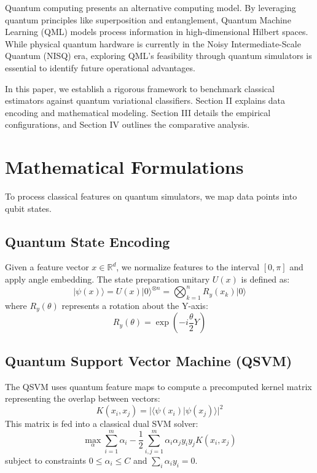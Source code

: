 \documentclass[journal]{IEEEtran}
\begin{document}
Quantum computing presents an alternative computing model. By leveraging quantum principles like superposition and entanglement, Quantum Machine Learning (QML) models process information in high-dimensional Hilbert spaces. While physical quantum hardware is currently in the Noisy Intermediate-Scale Quantum (NISQ) era, exploring QML's feasibility through quantum simulators is essential to identify future operational advantages.

In this paper, we establish a rigorous framework to benchmark classical estimators against quantum variational classifiers. Section II explains data encoding and mathematical modeling. Section III details the empirical configurations, and Section IV outlines the comparative analysis.

\section{Mathematical Formulations}
To process classical features on quantum simulators, we map data points into qubit states.

\subsection{Quantum State Encoding}
Given a feature vector $x \in \mathbb{R}^d$, we normalize features to the interval $[0, \pi]$ and apply angle embedding. The state preparation unitary $U(x)$ is defined as:
\begin{equation}
| \psi(x) \rangle = U(x) |0\rangle^{\otimes n} = \bigotimes_{k=1}^n R_y(x_k) |0\rangle
\end{equation}
where $R_y(\theta)$ represents a rotation about the Y-axis:
\begin{equation}
R_y(\theta) = \exp\left(-i\frac{\theta}{2}Y\right)
\end{equation}

\subsection{Quantum Support Vector Machine (QSVM)}
The QSVM uses quantum feature maps to compute a precomputed kernel matrix representing the overlap between vectors:
\begin{equation}
K(x_i, x_j) = |\langle \psi(x_i) | \psi(x_j) \rangle|^2
\end{equation}
This matrix is fed into a classical dual SVM solver:
\begin{equation}
\max_{\alpha} \sum_{i=1}^m \alpha_i - \frac{1}{2} \sum_{i,j=1}^m \alpha_i \alpha_j y_i y_j K(x_i, x_j)
\end{equation}
subject to constraints $0 \le \alpha_i \le C$ and $\sum_{i} \alpha_i y_i = 0$.
\end{document}
